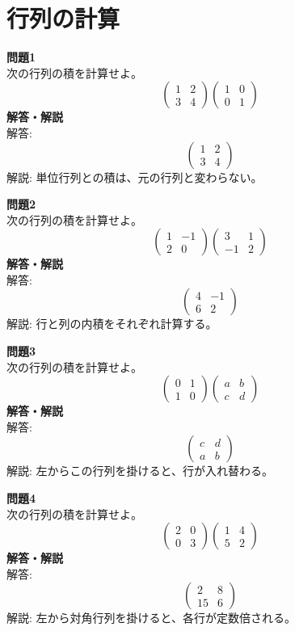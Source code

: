 \documentclass[a4paper,dvipdfmx]{jsarticle}
\begin{document}
\section{行列の計算}

\textbf{問題1}\\
次の行列の積を計算せよ。
$$ \begin{pmatrix} 1 & 2 \\ 3 & 4 \end{pmatrix} \begin{pmatrix} 1 & 0 \\ 0 & 1 \end{pmatrix} $$
\textbf{解答・解説}\\
解答: $$ \begin{pmatrix} 1 & 2 \\ 3 & 4 \end{pmatrix} $$
解説: 単位行列との積は、元の行列と変わらない。

\textbf{問題2}\\
次の行列の積を計算せよ。
$$ \begin{pmatrix} 1 & -1 \\ 2 & 0 \end{pmatrix} \begin{pmatrix} 3 & 1 \\ -1 & 2 \end{pmatrix} $$
\textbf{解答・解説}\\
解答: $$ \begin{pmatrix} 4 & -1 \\ 6 & 2 \end{pmatrix} $$
解説: 行と列の内積をそれぞれ計算する。

\textbf{問題3}\\
次の行列の積を計算せよ。
$$ \begin{pmatrix} 0 & 1 \\ 1 & 0 \end{pmatrix} \begin{pmatrix} a & b \\ c & d \end{pmatrix} $$
\textbf{解答・解説}\\
解答: $$ \begin{pmatrix} c & d \\ a & b \end{pmatrix} $$
解説: 左からこの行列を掛けると、行が入れ替わる。

\textbf{問題4}\\
次の行列の積を計算せよ。
$$ \begin{pmatrix} 2 & 0 \\ 0 & 3 \end{pmatrix} \begin{pmatrix} 1 & 4 \\ 5 & 2 \end{pmatrix} $$
\textbf{解答・解説}\\
解答: $$ \begin{pmatrix} 2 & 8 \\ 15 & 6 \end{pmatrix} $$
解説: 左から対角行列を掛けると、各行が定数倍される。
\end{document}
